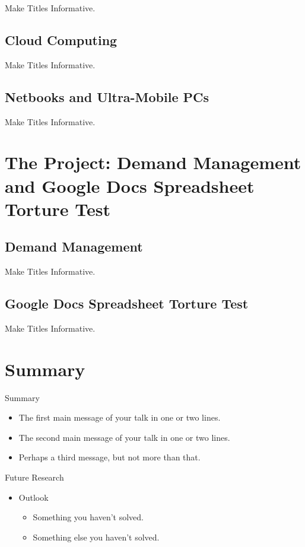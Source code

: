 \documentclass{beamer}
\begin{document}
\begin{frame}{Make Titles Informative.}
\end{frame}

\subsection{Cloud Computing}

\begin{frame}{Make Titles Informative.}
\end{frame}

\subsection{Netbooks and Ultra-Mobile PCs}

\begin{frame}{Make Titles Informative.}
\end{frame}

\section[Research Project]{The Project: Demand Management and Google Docs Spreadsheet Torture Test}

\subsection{Demand Management}

\begin{frame}{Make Titles Informative.}
\end{frame}

\subsection[GDocs Spreadsheet Testing]{Google Docs Spreadsheet Torture Test}

\begin{frame}{Make Titles Informative.}
\end{frame}

\section*{Summary}

\begin{frame}{Summary}

\begin{itemize}
  \item The \alert{first main message} of your talk in one or two lines.
  \item The \alert{second main message} of your talk in one or two lines.
  \item Perhaps a \alert{third message}, but not more than that.
\end{itemize}

\end{frame}

\begin{frame}{Future Research}
\begin{itemize}
  \item Outlook
  \begin{itemize}
    \item Something you haven't solved.
    \item Something else you haven't solved.
  \end{itemize}
  \end{itemize}
\end{frame}
\end{document}
